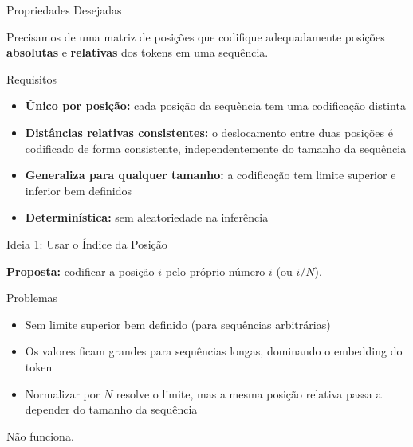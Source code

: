 \documentclass[aspectratio=169,xcolor=dvipsnames]{beamer}
\begin{document}
\begin{frame}{Propriedades Desejadas}

Precisamos de uma matriz de posições que codifique adequadamente posições \textbf{absolutas} e \textbf{relativas} dos tokens em uma sequência.

\vspace{8pt}

\begin{block}{Requisitos}
\begin{itemize}
    \item \textbf{Único por posição:} cada posição da sequência tem uma codificação distinta
    \item \textbf{Distâncias relativas consistentes:} o deslocamento entre duas posições é codificado de forma consistente, independentemente do tamanho da sequência
    \item \textbf{Generaliza para qualquer tamanho:} a codificação tem limite superior e inferior bem definidos
    \item \textbf{Determinística:} sem aleatoriedade na inferência
\end{itemize}
\end{block}

\end{frame}


\begin{frame}{Ideia 1: Usar o Índice da Posição}

\textbf{Proposta:} codificar a posição $i$ pelo próprio número $i$ (ou $i / N$).

\vspace{6pt}

\begin{alertblock}{Problemas}
\begin{itemize}
    \item Sem limite superior bem definido (para sequências arbitrárias)
    \item Os valores ficam grandes para sequências longas, dominando o embedding do token
    \item Normalizar por $N$ resolve o limite, mas a mesma posição relativa passa a depender do tamanho da sequência
\end{itemize}
\end{alertblock}

\vspace{6pt}

\centering
Não funciona.

\end{frame}
\end{document}
